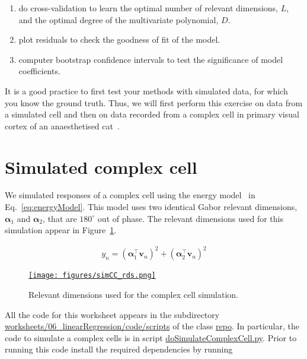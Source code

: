 \documentclass[12pt]{article}
\begin{document}
\begin{enumerate}

    \item do cross-validation to learn the optimal number of relevant dimensions,
        $L$, and the optimal degree of the multivariate polynomial, $D$.

    \item plot residuals to check the goodness of fit of the model.

    \item computer bootstrap confidence intervals to test the significance of
        model coefficients.

\end{enumerate}

It is a good practice to first test your methods with simulated data, for which
you know the ground truth. Thus, we will first perform this exercise on data from a
simulated cell and then on data recorded from a complex cell in primary visual
cortex of an anaesthetised cat~\citep{felsenEtAl05}.

\section{Simulated complex cell}

We simulated responses of a complex cell using the energy
model~\citep{adelsonAndBergen85} in Eq.~\ref{eq:energyModel}. This model
uses two identical Gabor relevant dimensions, $\bm{\alpha}_1$ and
$\bm{\alpha}_2$, that are $180^\circ$ out of phase. The relevant dimensions used for this simulation appear in Figure~\ref{fig:rdsSim}.

\begin{align}
    y_n=(\bm{\alpha}_1^\intercal\mathbf{v}_n)^2+(\bm{\alpha}_2^\intercal\mathbf{v}_n)^2
    \label{eq:energyModel}
\end{align}

\begin{figure}[H]
    \begin{center}
        \href{https://www.gatsby.ucl.ac.uk/~rapela/neuroinformatics/2023/ws6/figures/simCC.html}{\texttt{[image: figures/simCC\_rds.png]}}

        \caption{Relevant dimensions used for the complex cell simulation.}

        \label{fig:rdsSim}
    \end{center}
\end{figure}

All the code for this worksheet appears in the subdirectory
\href{https://github.com/joacorapela/neuroinformatics24/blob/master/worksheets/06_linearRegression/code/scripts}{worksheets/06\_linearRegression/code/scripts} of the class
\href{https://github.com/joacorapela/neuroinformatics24}{repo}. In particular,
the code to simulate a complex cells is in script
\href{https://github.com/joacorapela/neuroinformatics24/blob/master/worksheets/06_linearRegression/code/scripts/doSimulateComplexCell.py}{doSimulateComplexCell.py}.
Prior to running this code install the required dependencies by running
\end{document}
